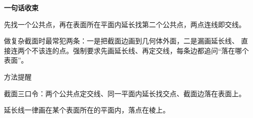 \documentclass{exam-zh}
\begin{document}
\begin{eduDualExplain}
  \begin{eduExplainLeft}
  \end{eduExplainLeft}

  \begin{eduExplainRight}
    \vspace{1mm}
    {\color{edu-blue}\bfseries\small 一句话收束}\par\vspace{1mm}
    \begin{eduBulletList}
      \item 先找一个公共点，再在表面所在平面内延长找第二个公共点，两点连线即交线。    \end{eduBulletList}
  \end{eduExplainRight}
\end{eduDualExplain}




\begin{eduMistakeBox}
做复杂截面时最常犯两条：一是把截面边画到几何体外面，二是漏画延长线、
直接连两个不该连的点。强制要求先画延长线、再定交线，每条边都追问“落在哪个表面”。
\end{eduMistakeBox}




\begin{eduSummaryBlock}{\eduIconPin}{方法提醒}
\begin{eduBulletList}
  \item 截面三口令：两个公共点定交线、同一平面内延长找交点、截面边落在表面上。  \item 延长线一律画在某个表面所在的平面内，落点在棱上。\end{eduBulletList}
\end{eduSummaryBlock}
\end{document}
